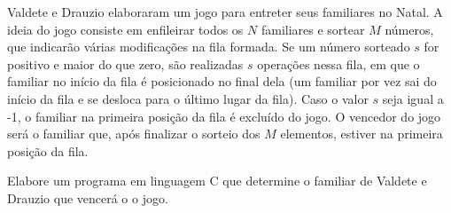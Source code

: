 Valdete e Drauzio elaboraram um jogo para entreter seus familiares no Natal. A ideia do jogo consiste em enfileirar todos os $N$ familiares e sortear $M$ números, que indicarão várias modificações na fila formada. Se um número sorteado $s$ for positivo e maior do que zero, são realizadas $s$ operações nessa fila, em que o familiar no início da fila é posicionado no final dela (um familiar por vez sai do início da fila e se desloca para o último lugar da fila). Caso o valor $s$ seja igual a -1, o familiar na primeira posição da fila é excluído do jogo. O vencedor do jogo será o familiar que, após finalizar o sorteio dos $M$ elementos, estiver na primeira posição da fila.

Elabore um programa em linguagem C que determine o familiar de Valdete e Drauzio que vencerá o o jogo.

